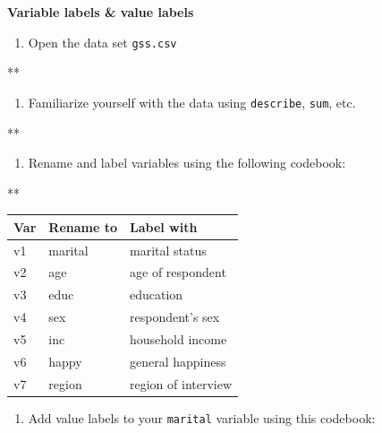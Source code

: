 \documentclass[
]{book}
\newenvironment{Shaded}{\begin{snugshade}}{\end{snugshade}}
\newcommand{\NormalTok}[1]{#1}
\providecommand{\tightlist}{%
  \setlength{\itemsep}{0pt}\setlength{\parskip}{0pt}}
\begin{document}
\textbf{Variable labels \& value labels}

\begin{enumerate}
\def\labelenumi{\arabic{enumi}.}
\tightlist
\item
  Open the data set \texttt{gss.csv}
\end{enumerate}

\begin{Shaded}
\begin{Highlighting}[]
\NormalTok{**}
\end{Highlighting}
\end{Shaded}

\begin{enumerate}
\def\labelenumi{\arabic{enumi}.}
\setcounter{enumi}{1}
\tightlist
\item
  Familiarize yourself with the data using \texttt{describe}, \texttt{sum}, etc.
\end{enumerate}

\begin{Shaded}
\begin{Highlighting}[]
\NormalTok{**}
\end{Highlighting}
\end{Shaded}

\begin{enumerate}
\def\labelenumi{\arabic{enumi}.}
\setcounter{enumi}{2}
\tightlist
\item
  Rename and label variables using the following codebook:
\end{enumerate}

\begin{Shaded}
\begin{Highlighting}[]
\NormalTok{**}
\end{Highlighting}
\end{Shaded}

\begin{longtable}[]{@{}lll@{}}
\toprule
Var & Rename to & Label with\tabularnewline
\midrule
\endhead
v1 & marital & marital status\tabularnewline
v2 & age & age of respondent\tabularnewline
v3 & educ & education\tabularnewline
v4 & sex & respondent's sex\tabularnewline
v5 & inc & household income\tabularnewline
v6 & happy & general happiness\tabularnewline
v7 & region & region of interview\tabularnewline
\bottomrule
\end{longtable}

\begin{enumerate}
\def\labelenumi{\arabic{enumi}.}
\setcounter{enumi}{3}
\tightlist
\item
  Add value labels to your \texttt{marital} variable using this codebook:
\end{enumerate}
\end{document}
